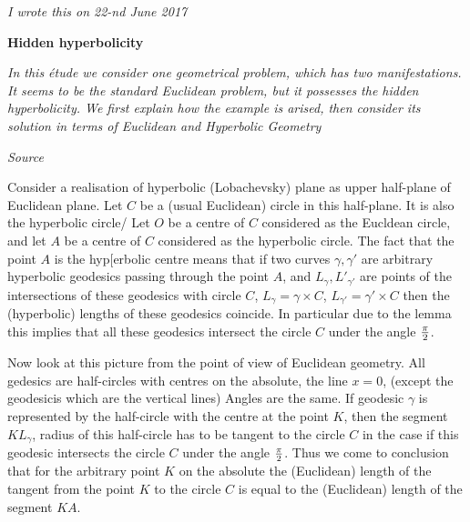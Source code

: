 



\baselineskip=14pt
\def\vare {\varepsilon}
\def\A {{\bf A}}
\def\t {\tilde}
\def\a {\alpha}
\def\K {{\bf K}}
\def\N {{\bf N}}
\def\V {{\cal V}}
\def\s {{\sigma}}
\def\S {{\Sigma}}
\def\s {{\sigma}}
\def\p{\partial}
\def\vare{{\varepsilon}}
\def\Q {{\bf Q}}
\def\D {{\cal D}}
\def\G {{\Gamma}}
\def\C {{\bf C}}
\def\M {{\cal M}}
\def\Z {{\bf Z}}
\def\U  {{\cal U}}
\def\H {{\cal H}}
\def\R  {{\bf R}}
\def\S  {{\bf S}}
\def\E  {{\bf E}}
\def\l {\lambda}
\def\degree {{\bf {\rm degree}\,\,}}
\def \finish {${\,\,\vrule height1mm depth2mm width 8pt}$}
\def \m {\medskip}
\def\p {\partial}
\def\r {{\bf r}}
\def\pt {{\bf pt}}
\def\v {{\bf v}}
\def\n {{\bf n}}
\def\t {{\bf t}}
\def\b {{\bf b}}
\def\c {{\bf c }}
\def\e{{\bf e}}
\def\ac {{\bf a}}
\def \X   {{\bf X}}
\def \Y   {{\bf Y}}
\def \x   {{\bf x}}
\def \y   {{\bf y}}
\def \G{{\cal G}}

{\it  I wrote this on 22-nd  June 2017}

\m


\centerline {\bf Hidden hyperbolicity}

{\it In this \'etude we consider one geometrical problem,
which has two manifestations. It seems to be
the standard Euclidean problem,  but it
 possesses the hidden hyperbolicity.
We first explain how the example is arised, then consider
its solution in terms of Euclidean and Hyperbolic Geometry}

\m

\centerline {\it Source}

Consider a realisation of hyperbolic (Lobachevsky) plane
as upper half-plane of Euclidean plane. Let $C$ be a (usual Euclidean)
circle in this half-plane. It is also the hyperbolic circle/
   Let $O$ be a centre of $C$ considered 
as the Eucldean circle, and 
let $A$ be a centre of $C$ considered 
as the hyperbolic  circle.
 The fact that the point $A$ is the hyp[erbolic centre 
means that if two curves $\gamma,\gamma'$ are  
arbitrary hyperbolic geodesics
passing through the point $A$, and 
$L_\gamma,L'_{\gamma'} $ are points
of the intersections of these geodesics 
with circle $C$, 
$L_\gamma=\gamma\times C$,  
$L_{\gamma'}=\gamma'\times C$  
then the (hyperbolic) lengths of these geodesics 
coincide. In particular due to the lemma this implies
that all these geodesics intersect the circle $C$
under the angle $\pi\over 2$.

Now look at this picture from the point of view 
of Euclidean geometry. 
   All gedesics are half-circles
with centres on the absolute, the line $x=0$,
(except the geodesicis which are the vertical lines)
Angles are the same. If geodesic $\gamma$ is represented
by the half-circle with the centre at the point 
$K$, then the segment $KL_\gamma$, radius of this half-circle
has to be tangent to the circle $C$ in the case if this geodesic
intersects the circle $C$ under the angle $\pi\over 2$.
 Thus we come to conclusion
that for the arbitrary  point $K$ on the absolute
the (Euclidean) length of the tangent from the point $K$ to the
circle $C$ is equal to the (Euclidean) length of the segment $KA$.

